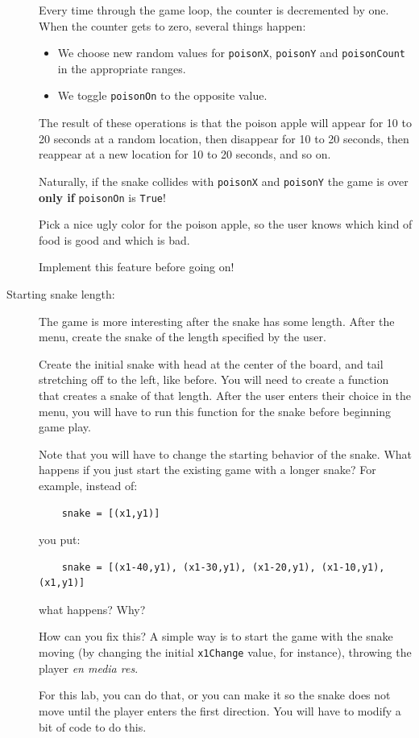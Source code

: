 \documentclass[12pt]{article}
\begin{document}
\begin{description}
Every time through the game loop, the counter is decremented
by one.  When the counter gets to zero, several things happen:
\begin{itemize}
\item We choose new random values for \lstinline{poisonX},
\lstinline{poisonY} and \lstinline{poisonCount} in the 
appropriate ranges.
\item We toggle \lstinline{poisonOn} to the opposite value.
\end{itemize}
The result of these operations is that the poison apple will
appear for 10 to 20 seconds at a random location, 
then disappear for 10 to 20 seconds, then reappear at a new
location for 10 to 20 seconds, and so on.

Naturally, if the snake collides with \lstinline{poisonX}
and \lstinline{poisonY} the game is over {\bf only if}
\lstinline{poisonOn} is \lstinline{True}!

Pick a nice ugly color for the poison apple, so the user
knows which kind of food is good and which is bad.

Implement this feature before going on!

\item[Starting snake length:] 
The game is more interesting after the snake
has some length.  After the menu, create the snake
of the length specified by the user.

Create the initial snake with head
at the center of the board, and tail stretching off to
the left, like before.  You will need to create a function that
creates a snake of that length.  After the user
enters their choice in the menu, you will have to
run this function for the snake before beginning 
game play.

Note that you will have to change the starting
behavior of the snake.  What happens if you 
just start the existing game with a longer snake?  For example,
instead of:
\begin{lstlisting}
    snake = [(x1,y1)]
\end{lstlisting}
you put:
\begin{lstlisting}
    snake = [(x1-40,y1), (x1-30,y1), (x1-20,y1), (x1-10,y1), (x1,y1)]
\end{lstlisting}
what happens?  Why?

How can you fix this?  A simple way is to start the game with the snake
moving (by changing the initial
\lstinline{x1Change} value, for instance), 
throwing the player {\em en media res}.  

For this lab, you can do that, or
you can make it so the snake does not move until
the player enters the first direction.  
You will have to modify a bit of code to do this.


\end{description}
\end{document}
